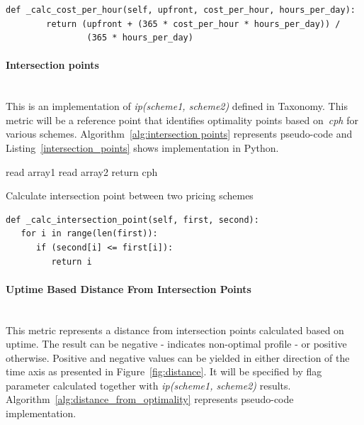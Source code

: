 \documentclass[]{final_report}
\newcommand{\myparagraph}[1]{\paragraph{#1}\mbox{}\\}
\begin{document}
\begin{minipage}{\linewidth}
\begin{lstlisting}[label={cost_per_hour},caption={Cost per hour implementation in Python},frame=single] 
def _calc_cost_per_hour(self, upfront, cost_per_hour, hours_per_day):
        return (upfront + (365 * cost_per_hour * hours_per_day)) /
                (365 * hours_per_day)
\end{lstlisting}
\end{minipage}

\myparagraph{Intersection points}

This is an implementation of \textit{ip(scheme1, scheme2)} defined in Taxonomy. This metric will be a reference point that identifies optimality points based on~\textit{cph} for various schemes. Algorithm~\ref{alg:intersection points} represents pseudo-code and Listing~\ref{intersection_points} shows implementation in Python. 

\begin{algorithm}[H]
 \label{alg:intersection points}
 read array1\;
 read array2\;
  {
 	 {
 		return cph
 	}
 }
\caption{Calculate intersection point between two pricing schemes}
\end{algorithm}

\begin{minipage}{\linewidth}
\begin{lstlisting}[label={intersection_points},caption={Intersection point between various pricing schemes},frame=single] 
def _calc_intersection_point(self, first, second):
   for i in range(len(first)):
      if (second[i] <= first[i]):
         return i
\end{lstlisting}
\end{minipage}

\myparagraph{Uptime Based Distance From Intersection Points}

This metric represents a distance from intersection points calculated based on uptime. The result can be negative - indicates non-optimal profile - or positive otherwise. Positive and negative values can be yielded in either direction of the time axis as presented in Figure~\ref{fig:distance}. 
It will be specified by flag parameter calculated together with \textit{ip(scheme1, scheme2)} results. Algorithm~\ref{alg:distance_from_optimality} represents pseudo-code implementation.
\end{document}
